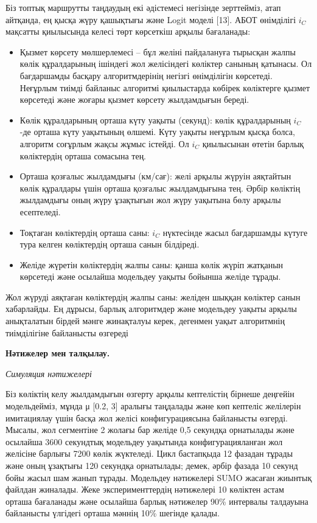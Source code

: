 Біз топтық маршрутты таңдаудың екі әдістемесі негізінде зерттейміз, атап
айтқанда, ең қысқа жүру қашықтығы және Logit моделі {[}13{]}. АБОТ
өнімділігі \(i_{C}\) мақсатты қиылысында келесі төрт көрсеткіш арқылы
бағаланады:

\begin{itemize}
\item
  Қызмет көрсету мөлшерлемесі -- бұл желіні пайдалануға тырысқан жалпы
  көлік құралдарының ішіндегі жол желісіндегі көліктер санының қатынасы.
  Ол бағдаршамды басқару алгоритмдерінің негізгі өнімділігін көрсетеді.
  Неғұрлым тиімді байланыс алгоритмі қиылыстарда көбірек көліктерге
  қызмет көрсетеді және жоғары қызмет көрсету жылдамдығын береді.
\item
  Көлік құралдарының орташа күту уақыты (секунд): көлік құралдарының
  \(i_{C}\) -де орташа күту уақытының өлшемі. Күту уақыты неғұрлым қысқа
  болса, алгоритм соғұрлым жақсы жұмыс істейді. Ол \(i_{C}\) қиылысынан
  өтетін барлық көліктердің орташа сомасына тең.
\item
  Орташа қозғалыс жылдамдығы (км/сағ): желі арқылы жүруін аяқтайтын
  көлік құралдары үшін орташа қозғалыс жылдамдығына тең. Әрбір көліктің
  жылдамдығы оның жүру ұзақтығын жол жүру уақытына бөлу арқылы
  есептеледі.
\item
  Тоқтаған көліктердің орташа саны: \(i_{C}\) нүктесінде жасыл
  бағдаршамды күтуге тура келген көліктердің орташа санын білдіреді.
\item
  Желіде жүретін көліктердің жалпы саны: қанша көлік жүріп жатқанын
  көрсетеді және осылайша модельдеу уақыты бойынша желіде тұрады.
\end{itemize}

Жол жүруді аяқтаған көліктердің жалпы саны: желіден шыққан көліктер
санын хабарлайды. Ең дұрысы, барлық алгоритмдер және модельдеу уақыты
арқылы анықталатын бірдей мәнге жинақталуы керек, дегенмен уақыт
алгоритмнің тиімділігіне байланысты өзгереді

{\bfseries Нәтижелер мен талқылау.}

\emph{Симуляция нәтижелері}

Біз көліктің келу жылдамдығын өзгерту арқылы кептелістің бірнеше
деңгейін модельдейміз, мұнда μ {[}0.2, 3{]} аралығы таңдалады және көп
кептеліс желілерін имитациялау үшін басқа жол желісі конфигурациясына
байланысты өзгерді. Мысалы, жол сегментіне 2 жолағы бар желіде 0,5
секундқа орнатылады және осылайша 3600 секундтық модельдеу уақытында
конфигурацияланған жол желісіне барлығы 7200 көлік жүктеледі. Цикл
бастапқыда 12 фазадан тұрады және оның ұзақтығы 120 секундқа орнатылады;
демек, әрбір фазада 10 секунд бойы жасыл шам жанып тұрады. Модельдеу
нәтижелері SUMO жасаған жиынтық файлдан жиналады. Жеке эксперименттердің
нәтижелері 10 көліктен астам орташа бағаланады және осылайша барлық
нәтижелер 90\% интервалы талдауына байланысты үлгідегі орташа мәннің
10\% шегінде қалады.

